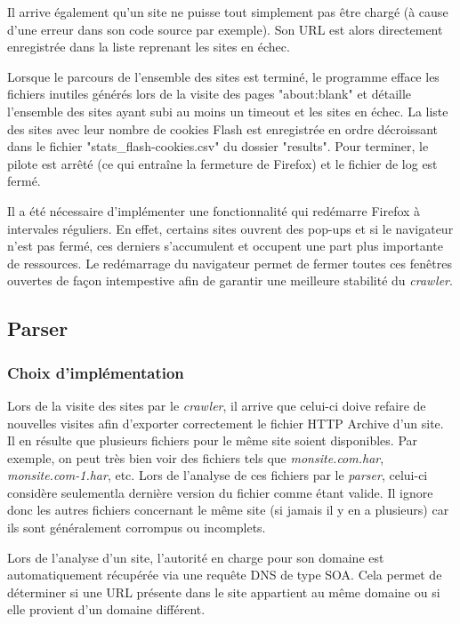 Il arrive également qu'un site ne puisse tout simplement pas être chargé (à cause d'une erreur dans son code source par exemple). Son URL est alors directement enregistrée dans la liste reprenant les sites en échec.
\newline

Lorsque le parcours de l'ensemble des sites est terminé, le programme efface les fichiers inutiles générés lors de la visite des pages "about:blank" et détaille l'ensemble des sites ayant subi au moins un timeout et les sites en échec. La liste des sites avec leur nombre de cookies Flash est enregistrée en ordre décroissant dans le fichier "stats\_flash-cookies.csv" du dossier "results". Pour terminer, le pilote est arrêté (ce qui entraîne la fermeture de Firefox) et le fichier de log est fermé.
\newline

Il a été nécessaire d'implémenter une fonctionnalité qui redémarre Firefox à intervales réguliers. En effet, certains sites ouvrent des pop-ups et si le navigateur n'est pas fermé, ces derniers s'accumulent et occupent une part plus importante de ressources. Le redémarrage du navigateur permet de fermer toutes ces fenêtres ouvertes de façon intempestive afin de garantir une meilleure stabilité du \textit{crawler}.

\subsection{Parser}
\label{parser}
\subsubsection{Choix d'implémentation}
Lors de la visite des sites par le \textit{crawler}, il arrive que celui-ci doive refaire de nouvelles visites afin d'exporter correctement le fichier HTTP Archive d'un site. Il en résulte que plusieurs fichiers pour le même site soient disponibles. Par exemple, on peut très bien voir des fichiers tels que \textit{monsite.com.har}, \textit{monsite.com-1.har}, etc. Lors de l'analyse de ces fichiers par le \textit{parser}, celui-ci considère seulementla dernière version du fichier comme étant valide. Il ignore donc les autres fichiers concernant le même site (si jamais il y en a plusieurs) car ils sont généralement corrompus ou incomplets.
\newline

Lors de l'analyse d'un site, l'autorité en charge pour son domaine est automatiquement récupérée via une requête DNS de type SOA. Cela permet de déterminer si une URL présente dans le site appartient au même domaine ou si elle provient d'un domaine différent.

